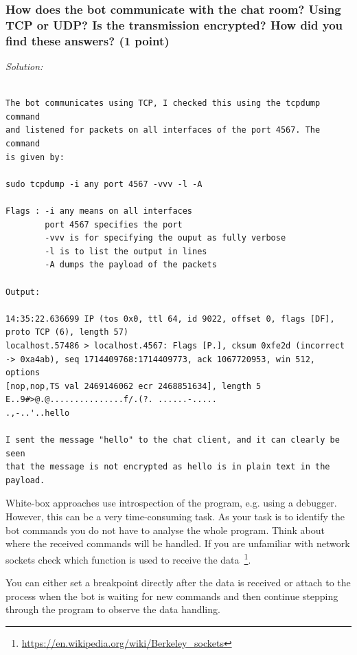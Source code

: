 \documentclass[a4paper,11pt]{article}
\newenvironment{solution}%
{\par{\noindent\small\textit{Solution:}}\vspace{-12pt}\begin{framed}}%
{\end{framed}\par}
\begin{document}
\subsubsection*{How does the bot communicate with the chat room? Using TCP or
UDP? Is the transmission encrypted? How did you find these answers?
\ifsolution (1 point) \fi}
\ifsolution
\begin{solution}

\begin{verbatim}

The bot communicates using TCP, I checked this using the tcpdump command
and listened for packets on all interfaces of the port 4567. The command 
is given by: 

sudo tcpdump -i any port 4567 -vvv -l -A

Flags : -i any means on all interfaces
        port 4567 specifies the port 
        -vvv is for specifying the ouput as fully verbose
        -l is to list the output in lines
        -A dumps the payload of the packets
        
Output:

14:35:22.636699 IP (tos 0x0, ttl 64, id 9022, offset 0, flags [DF],
proto TCP (6), length 57)
localhost.57486 > localhost.4567: Flags [P.], cksum 0xfe2d (incorrect -> 0xa4ab), seq 1714409768:1714409773, ack 1067720953, win 512, options
[nop,nop,TS val 2469146062 ecr 2468851634], length 5
E..9#>@.@...............f/.(?. ......-.....
.,-..'..hello

I sent the message "hello" to the chat client, and it can clearly be seen
that the message is not encrypted as hello is in plain text in the payload.
\end{verbatim}

\end{solution}\fi

White-box approaches use introspection of the program, e.g. using a debugger.
However, this can be a very time-consuming task. As your task is to identify the
bot commands you do not have to analyse the whole program. Think about where the
received commands will be handled. If you are unfamiliar with network sockets
check which function is used to receive the
data~\footnote{\url{https://en.wikipedia.org/wiki/Berkeley_sockets}}.

You can either set a breakpoint directly after the data is received or attach to
the process when the bot is waiting for new commands and then continue stepping
through the program to observe the data handling.
\end{document}
